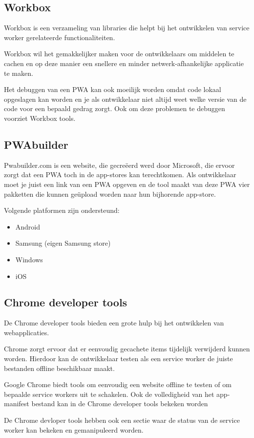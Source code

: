 		

\subsection{Workbox}

	Workbox is een verzameling van libraries die helpt bij het ontwikkelen van service worker gerelateerde functionaliteiten.
	
	Workbox wil het gemakkelijker maken voor de ontwikkelaars om middelen te cachen en op deze manier een snellere en minder netwerk-afhankelijke applicatie te maken.
	
	Het debuggen van een PWA kan ook moeilijk worden omdat code lokaal opgeslagen kan worden en je als ontwikkelaar niet altijd weet welke versie van de code voor een bepaald gedrag zorgt. Ook om deze problemen te debuggen voorziet Workbox tools.
	\autocite{Workbox2020}
	

\subsection{PWAbuilder}

	Pwabuilder.com is een website, die gecreëerd werd door Microsoft, die ervoor zorgt dat een PWA toch in de app-stores kan terechtkomen. Als ontwikkelaar moet je juist een link van een PWA opgeven en de tool maakt van deze PWA vier pakketten die kunnen geüpload worden naar hun bijhorende app-store. 
	
	Volgende platformen zijn ondersteund:
	
	\begin{itemize}
		\item	Android
		\item	Samsung (eigen Samsung store)
		\item	Windows
		\item	iOS
	\end{itemize}
	\autocite{PWAbuilder2020}
	
	
\subsection{Chrome developer tools}
	De Chrome developer tools bieden een grote hulp bij het ontwikkelen van webapplicaties.
	
	Chrome zorgt ervoor dat er eenvoudig gecachete items tijdelijk verwijderd kunnen worden. Hierdoor kan de ontwikkelaar testen als een service worker de juiste bestanden offline beschikbaar maakt.
	
	Google Chrome biedt tools om eenvoudig een website offline te testen of om bepaalde service workers uit te schakelen.
	Ook de volledigheid van het app-manifest bestand kan in de Chrome developer tools bekeken worden
	
	De Chrome devloper tools hebben ook een sectie waar de status van de service worker kan bekeken en gemanipuleerd worden.
	\autocite{Developers2019b}
	

	
	